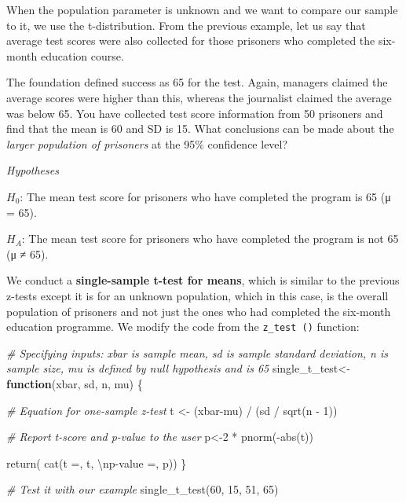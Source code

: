 \documentclass[
]{book}
\newenvironment{Shaded}{\begin{snugshade}}{\end{snugshade}}
\newcommand{\CommentTok}[1]{\textcolor[rgb]{0.56,0.35,0.01}{\textit{#1}}}
\newcommand{\ControlFlowTok}[1]{\textcolor[rgb]{0.13,0.29,0.53}{\textbf{#1}}}
\newcommand{\DecValTok}[1]{\textcolor[rgb]{0.00,0.00,0.81}{#1}}
\newcommand{\FunctionTok}[1]{\textcolor[rgb]{0.00,0.00,0.00}{#1}}
\newcommand{\NormalTok}[1]{#1}
\newcommand{\OtherTok}[1]{\textcolor[rgb]{0.56,0.35,0.01}{#1}}
\newcommand{\SpecialCharTok}[1]{\textcolor[rgb]{0.00,0.00,0.00}{#1}}
\newcommand{\StringTok}[1]{\textcolor[rgb]{0.31,0.60,0.02}{#1}}
\begin{document}
When the population parameter is unknown and we want to compare our sample to it, we use the t-distribution. From the previous example, let us say that average test scores were also collected for those prisoners who completed the six-month education course.

The foundation defined success as 65 for the test. Again, managers claimed the average scores were higher than this, whereas the journalist claimed the average was below 65. You have collected test score information from 50 prisoners and find that the mean is 60 and SD is 15. What conclusions can be made about the \emph{larger population of prisoners} at the 95\% confidence level?

\emph{Hypotheses}

\(H_0\): The mean test score for prisoners who have completed the program is 65 (μ = 65).

\(H_A\): The mean test score for prisoners who have completed the program is not 65 (μ ≠ 65).

We conduct a \textbf{single-sample t-test for means}, which is similar to the previous z-tests except it is for an unknown population, which in this case, is the overall population of prisoners and not just the ones who had completed the six-month education programme. We modify the code from the \texttt{z\_test\ ()} function:

\begin{Shaded}
\begin{Highlighting}[]
\CommentTok{\# Specifying inputs: xbar is sample mean, sd is sample standard deviation, n is sample size, mu is defined by null hypothesis and is 65}
\NormalTok{single\_t\_test}\OtherTok{\textless{}{-}}\ControlFlowTok{function}\NormalTok{(xbar, sd, n, mu) \{ }

\CommentTok{\# Equation for one{-}sample z{-}test}
\NormalTok{t }\OtherTok{\textless{}{-}}\NormalTok{ (xbar}\SpecialCharTok{{-}}\NormalTok{mu) }\SpecialCharTok{/}\NormalTok{ (sd }\SpecialCharTok{/} \FunctionTok{sqrt}\NormalTok{(n }\SpecialCharTok{{-}} \DecValTok{1}\NormalTok{)) }

\CommentTok{\# Report t{-}score and p{-}value to the user}
\NormalTok{p}\OtherTok{\textless{}{-}}\DecValTok{2} \SpecialCharTok{*} \FunctionTok{pnorm}\NormalTok{(}\SpecialCharTok{{-}}\FunctionTok{abs}\NormalTok{(t)) }

\FunctionTok{return}\NormalTok{( }\FunctionTok{cat}\NormalTok{(}\StringTok{\textquotesingle{}t =\textquotesingle{}}\NormalTok{, t, }
\StringTok{\textquotesingle{}}\SpecialCharTok{\textbackslash{}n}\StringTok{p{-}value =\textquotesingle{}}\NormalTok{, p))}
\NormalTok{\} }

\CommentTok{\# Test it with our example }
\FunctionTok{single\_t\_test}\NormalTok{(}\DecValTok{60}\NormalTok{, }\DecValTok{15}\NormalTok{, }\DecValTok{51}\NormalTok{, }\DecValTok{65}\NormalTok{)}
\end{Highlighting}
\end{Shaded}
\end{document}
